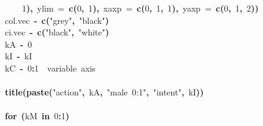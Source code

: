 \documentclass{article}
\makeatletter
\newcommand{\hlnumber}[1]{\textcolor[rgb]{0,0,0}{#1}}%
\newcommand{\hlfunctioncall}[1]{\textcolor[rgb]{.5,0,.33}{\textbf{#1}}}%
\newcommand{\hlstring}[1]{\textcolor[rgb]{.6,.6,1}{#1}}%
\newcommand{\hlkeyword}[1]{\textbf{#1}}%
\newcommand{\hlargument}[1]{\textcolor[rgb]{.69,.25,.02}{#1}}%
\newcommand{\hlcomment}[1]{\textcolor[rgb]{.18,.6,.34}{#1}}%
\newcommand{\hlassignement}[1]{\textbf{#1}}%
\newcommand{\hlsymbol}[1]{#1}%
\newcommand{\hlstd}[1]{\textcolor[rgb]{0,0,0}{#1}}%
\newenvironment{kframe}{%
 \def\FrameCommand##1{\hskip\@totalleftmargin \hskip-\fboxsep
 \colorbox{shadecolor}{##1}\hskip-\fboxsep
     \hskip-\linewidth \hskip-\@totalleftmargin \hskip\columnwidth}%
 \MakeFramed {\advance\hsize-\width
   \@totalleftmargin\z@ \linewidth\hsize
   \@setminipage}}%
 {\par\unskip\endMakeFramed}
\newenvironment{knitrout}{}{} %
\makeatother
\begin{document}
\begin{knitrout}
{\begin{kframe}
\begin{flushleft}
\hlstd{}{\ }{\ }{\ }{\ }{\ }{\ }{\ }{\ }\hlnumber{1}\hlkeyword{)}\hlkeyword{,}{\ }\hlargument{ylim}{\ }\hlargument{=}{\ }\hlfunctioncall{c}\hlkeyword{(}\hlnumber{0}\hlkeyword{,}{\ }\hlnumber{1}\hlkeyword{)}\hlkeyword{,}{\ }\hlargument{xaxp}{\ }\hlargument{=}{\ }\hlfunctioncall{c}\hlkeyword{(}\hlnumber{0}\hlkeyword{,}{\ }\hlnumber{1}\hlkeyword{,}{\ }\hlnumber{1}\hlkeyword{)}\hlkeyword{,}{\ }\hlargument{yaxp}{\ }\hlargument{=}{\ }\hlfunctioncall{c}\hlkeyword{(}\hlnumber{0}\hlkeyword{,}{\ }\hlnumber{1}\hlkeyword{,}{\ }\hlnumber{2}\hlkeyword{)}\hlkeyword{)}\hspace*{\fill}\\
\hlstd{}{\ }{\ }{\ }{\ }\hlsymbol{col.vec}{\ }\hlassignement{\usebox{\hlnormalsizeboxlessthan}-}{\ }\hlfunctioncall{c}\hlkeyword{(}\hlstring{"{}grey"{}}\hlkeyword{,}{\ }\hlstring{"{}black"{}}\hlkeyword{)}\hspace*{\fill}\\
\hlstd{}{\ }{\ }{\ }{\ }\hlsymbol{ci.vec}{\ }\hlassignement{\usebox{\hlnormalsizeboxlessthan}-}{\ }\hlfunctioncall{c}\hlkeyword{(}\hlstring{"{}black"{}}\hlkeyword{,}{\ }\hlstring{"{}white"{}}\hlkeyword{)}\hspace*{\fill}\\
\hlstd{}{\ }{\ }{\ }{\ }\hlsymbol{kA}{\ }\hlassignement{\usebox{\hlnormalsizeboxlessthan}-}{\ }\hlnumber{0}\hspace*{\fill}\\
\hlstd{}{\ }{\ }{\ }{\ }\hlsymbol{kI}{\ }\hlassignement{\usebox{\hlnormalsizeboxlessthan}-}{\ }\hlsymbol{kI}\hspace*{\fill}\\
\hlstd{}{\ }{\ }{\ }{\ }\hlsymbol{kC}{\ }\hlassignement{\usebox{\hlnormalsizeboxlessthan}-}{\ }\hlnumber{0}\hlkeyword{:}\hlnumber{1}{\ }{\ }\hlcomment{\usebox{\hlnormalsizeboxhash}\usebox{\hlnormalsizeboxhash}{\ }variable{\ }axis}\hspace*{\fill}\\
\hlstd{}\hspace*{\fill}\\
\hlstd{}{\ }{\ }{\ }{\ }\hlfunctioncall{title}\hlkeyword{(}\hlfunctioncall{paste}\hlkeyword{(}\hlstring{"{}action"{}}\hlkeyword{,}{\ }\hlsymbol{kA}\hlkeyword{,}{\ }\hlstring{"{}male{\ }0:1"{}}\hlkeyword{,}{\ }\hlstring{"{}intent"{}}\hlkeyword{,}{\ }\hlsymbol{kI}\hlkeyword{)}\hlkeyword{)}\hspace*{\fill}\\
\hlstd{}\hspace*{\fill}\\
\hlstd{}{\ }{\ }{\ }{\ }\hlkeyword{for}{\ }\hlkeyword{(}\hlsymbol{kM}{\ }\hlkeyword{in}{\ }\hlnumber{0}\hlkeyword{:}\hlnumber{1}\hlkeyword{)}{\ }\hlkeyword{\usebox{\hlnormalsizeboxopenbrace}}\hspace*{\fill}\\

\end{flushleft}
\end{kframe}}
\end{knitrout}
\end{document}
